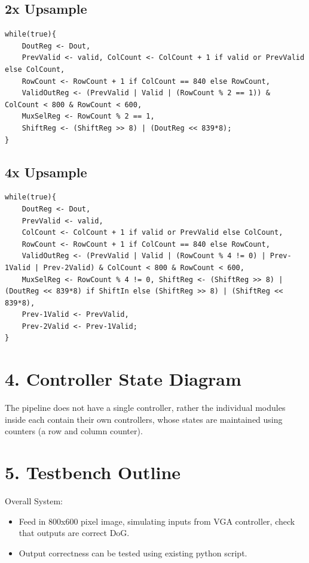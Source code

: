 \documentclass[11pt]{article}
\begin{document}
\subsection*{2x Upsample}
\begin{lstlisting}
while(true){
    DoutReg <- Dout, 
    PrevValid <- valid, ColCount <- ColCount + 1 if valid or PrevValid else ColCount, 
    RowCount <- RowCount + 1 if ColCount == 840 else RowCount, 
    ValidOutReg <- (PrevValid | Valid | (RowCount % 2 == 1)) & ColCount < 800 & RowCount < 600, 
    MuxSelReg <- RowCount % 2 == 1, 
    ShiftReg <- (ShiftReg >> 8) | (DoutReg << 839*8);
}
\end{lstlisting}

\subsection*{4x Upsample}
\begin{lstlisting}
while(true){
    DoutReg <- Dout, 
    PrevValid <- valid, 
    ColCount <- ColCount + 1 if valid or PrevValid else ColCount, 
    RowCount <- RowCount + 1 if ColCount == 840 else RowCount, 
    ValidOutReg <- (PrevValid | Valid | (RowCount % 4 != 0) | Prev-1Valid | Prev-2Valid) & ColCount < 800 & RowCount < 600, 
    MuxSelReg <- RowCount % 4 != 0, ShiftReg <- (ShiftReg >> 8) | (DoutReg << 839*8) if ShiftIn else (ShiftReg >> 8) | (ShiftReg << 839*8), 
    Prev-1Valid <- PrevValid, 
    Prev-2Valid <- Prev-1Valid;
}
\end{lstlisting}


\section*{4. Controller State Diagram}

The pipeline does not have a single controller, rather the individual modules
inside each contain their own controllers, whose states are maintained using
counters (a row and column counter).




\section*{5. Testbench Outline}
Overall System:
\begin{itemize}
    \item Feed in 800x600 pixel image, simulating inputs from VGA controller, check that outputs are correct DoG.
    \item Output correctness can be tested using existing python script.
\end{itemize}
\end{document}
